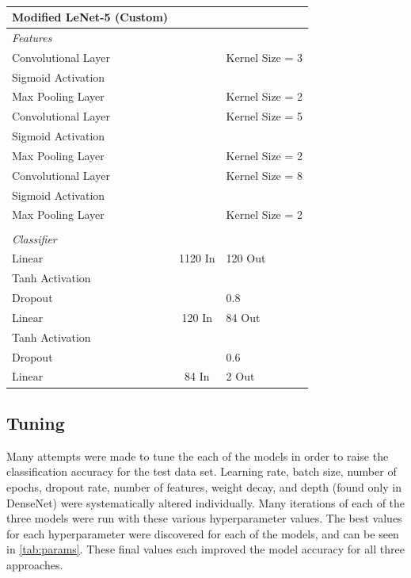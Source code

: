 \documentclass[manuscript,screen,review]{acmart}
\begin{document}
\begin{table}[h!]
\caption{}
  \label{tab:custom}
  \begin{tabular}{lcl}
    \textbf{Modified LeNet-5 (Custom)} \\
    \toprule
    \textit{Features} \\
    \midrule
    Convolutional Layer &  & Kernel Size = 3 \\
    Sigmoid Activation & & \\
    Max Pooling Layer & & Kernel Size = 2\\
    Convolutional Layer &  & Kernel Size = 5 \\
    Sigmoid Activation & & \\
    Max Pooling Layer & & Kernel Size = 2\\
    Convolutional Layer &  & Kernel Size = 8 \\
    Sigmoid Activation & & \\
    Max Pooling Layer & & Kernel Size = 2\\
     & & \\
    \textit{Classifier} \\
    \midrule
    Linear & 1120 In & 120 Out\\
    Tanh Activation & & \\
    Dropout & & 0.8 \\
    Linear & 120 In & 84 Out\\
    Tanh Activation & & \\
    Dropout & & 0.6 \\
    Linear & 84 In & 2 Out\\
  \bottomrule
\end{tabular}
\end{table}


\subsection{Tuning}

Many attempts were made to tune the each of the models in order to raise the classification accuracy for the test data set. Learning rate, batch size, number of epochs, dropout rate, number of features, weight decay, and depth (found only in DenseNet) were systematically altered individually. Many iterations of each of the three models were run with these various hyperparameter values. The best values for each hyperparameter were discovered for each of the models, and can be seen in \cref{tab:params}. These final values each improved the model accuracy for all three approaches.
\end{document}
